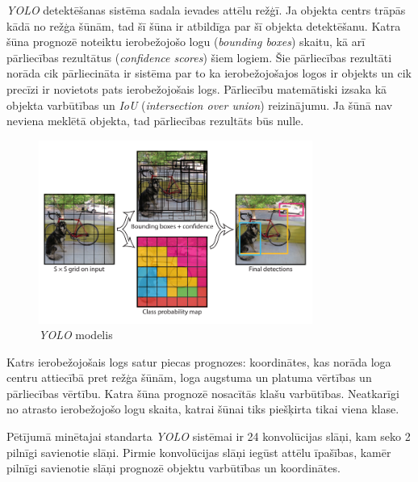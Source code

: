 \textit{YOLO} detektēšanas sistēma sadala ievades attēlu režģī. Ja objekta centrs trāpās kādā no režģa šūnām, tad šī šūna ir atbildīga par šī objekta detektēšanu. Katra šūna prognozē noteiktu ierobežojošo logu (\textit{bounding boxes}) skaitu, kā arī pārliecības rezultātus (\textit{confidence scores}) šiem logiem. Šie pārliecības rezultāti norāda cik pārliecināta ir sistēma par to ka ierobežojošajos logos ir objekts un cik precīzi ir novietots pats ierobežojošais logs. Pārliecību matemātiski izsaka kā objekta varbūtības un \textit{IoU} (\textit{intersection over union}) reizinājumu. Ja šūnā nav neviena meklētā objekta, tad pārliecības rezultāts būs nulle.

\begin{figure}[h]%
	\centering
	\includegraphics[height=6cm]{images/yolo.png} %
	\caption{\textit{YOLO} modelis \cite{redmon2016you}}%
	\label{fig:example}%
\end{figure}

Katrs ierobežojošais logs satur piecas prognozes: koordinātes, kas norāda loga centru attiecībā pret režģa šūnām, loga augstuma un platuma vērtības un pārliecības vērtību. Katra šūna prognozē nosacītās klašu varbūtības. Neatkarīgi no atrasto ierobežojošo logu skaita, katrai šūnai tiks piešķirta tikai viena klase.

Pētījumā \cite{redmon2016you} minētajai standarta \textit{YOLO} sistēmai ir 24 konvolūcijas slāņi, kam seko 2 pilnīgi savienotie slāņi. Pirmie konvolūcijas slāņi iegūst attēlu īpašības, kamēr pilnīgi savienotie slāņi prognozē objektu varbūtības un koordinātes.

